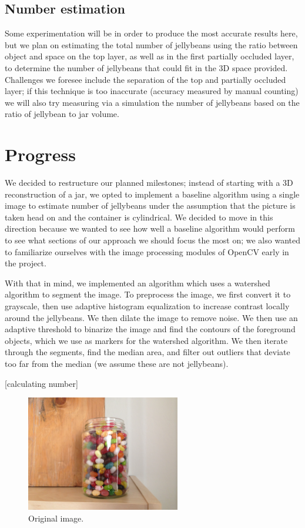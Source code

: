 \documentclass{article}
\begin{document}
\subsection*{Number estimation} 

Some experimentation will be in order to produce the most accurate results here, but we plan on estimating the total number of jellybeans using the ratio between object and space on the top layer, as well as in the first partially occluded layer, to determine the number of jellybeans that could fit in the 3D space provided. Challenges we foresee include the separation of the top and partially occluded layer; if this technique is too inaccurate (accuracy measured by manual counting) we will also try measuring via a simulation the number of jellybeans based on the ratio of jellybean to jar volume.

\section*{Progress}

We decided to restructure our planned milestones; instead of starting with a 3D reconstruction of a jar, we opted to implement a baseline algorithm using a single image to estimate number of jellybeans under the assumption that the picture is taken head on and the container is cylindrical. We decided to move in this direction because we wanted to see how well a baseline algorithm would perform to see what sections of our approach we should focus the most on; we also wanted to familiarize ourselves with the image processing modules of OpenCV early in the project.

With that in mind, we implemented an algorithm which uses a watershed algorithm to segment the image. To preprocess the image, we first convert it to grayscale, then use adaptive histogram equalization to increase contrast locally around the jellybeans. We then dilate the image to remove noise. We then use an adaptive threshold to binarize the image and find the contours of the foreground objects, which we use as markers for the watershed algorithm. We then iterate through the segments, find the median area, and filter out outliers that deviate too far from the median (we assume these are not jellybeans).

[calculating number]

\begin{figure}[h]
\centering
\includegraphics[width=0.6\textwidth]{../img/img1.jpg}
\caption{Original image.}
\end{figure}
\end{document}
